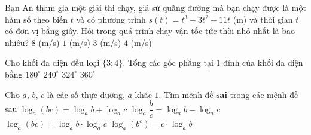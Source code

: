\begin{ex}%
	Bạn An tham gia một giải thi chạy, giả sử quãng đường mà bạn chạy được là một hàm số theo biến $t$ và có phương trình $s(t)=t^3-3t^2+11t$ (m) và thời gian $t$ có đơn vị bằng giây. Hỏi trong quá trình chạy vận tốc tức thời nhỏ nhất là bao nhiêu?
	\choice
	{\True  $8$ (m/s)}
	{$1$ (m/s) }
	{$3$ (m/s)}
	{$4$ (m/s)}
\end{ex}

\begin{ex}%
	Cho khối đa diện đều loại $\{3; 4\}$. Tổng các góc phẳng tại $1$ đỉnh của khối đa diện bằng
	\choice
	{$180^\circ $}
	{\True $240^\circ $}
	{$324^\circ $}
	{$360^\circ $}
\end{ex}

\begin{ex}%
	Cho $a$, $b$, $c$ là các số thực dương, $a$ khác $1$. Tìm mệnh đề \textbf{sai} trong các mệnh đề sau
	\choice
	{$\log_a(bc)=\log_ab+\log_ac$}
	{$\log_a\dfrac{b}{c}=\log_ab-\log_ac$}
	{\True $\log_a(bc)=\log_ab \cdot \log_ac$}
	{$\log_a(b^c)=c\cdot \log_ab$}
\end{ex}

